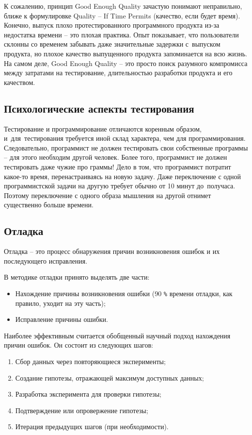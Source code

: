 \documentclass{ou}
\begin{document}
К сожалению, принцип Good Enough Quality зачастую понимают неправильно, ближе к формулировке Quality -- If Time Permits (качество, если будет время). Конечно, выпуск плохо протестированного программного продукта из-за недостатка времени -- это плохая практика. Опыт показывает, что пользователи склонны со временем забывать даже значительные задержки с~выпуском продукта, но плохое качество выпущенного продукта запоминается на всю жизнь. На самом деле, Good Enough Quality -- это просто поиск разумного компромисса между затратами на тестирование, длительностью разработки продукта и его качеством.
\subsection{Психологические аспекты тестирования}
Тестирование и программирование отличаются коренным образом, и~для~тестирования требуется иной склад характера, чем для программирования. Следовательно, программист не должен тестировать свои собственные программы -- для этого необходим другой человек. Более того, программист не должен тестировать даже чужие про граммы! Дело в том, что программист потратит какое-то время, перенастраиваясь на новую задачу. Даже переключение с одной программистской задачи на другую требует обычно от 10 минут до~получаса. Поэтому переключение с одного образа мышления на другой отнимет существенно больше времени.
\subsection{Отладка}
Отладка -- это процесс обнаружения причин возникновения ошибок и их последующего исправления.

В методике отладки принято выделять две части:
\begin{itemize}[label=-, leftmargin=0em, itemindent=3.35em, nosep]
\item Нахождение причины возникновения ошибки (90 \verb|%| времени отладки, как правило, уходит на эту часть); 
\item Исправление причины ошибки.
\end{itemize}

Наиболее эффективным считается обобщенный научный подход нахождения причин ошибок. Он состоит из следующих шагов:
\begin{enumerate}[leftmargin=0em, itemindent=3.75em, nosep, label=\arabic*)]
\item Сбор данных через повторяющиеся эксперименты;
\item Создание гипотезы, отражающей максимум доступных данных;
\item Разработка эксперимента для проверки гипотезы; 
\item Подтверждение или опровержение гипотезы;
\item Итерация предыдущих шагов (при необходимости).
\end{enumerate}
\end{document}
